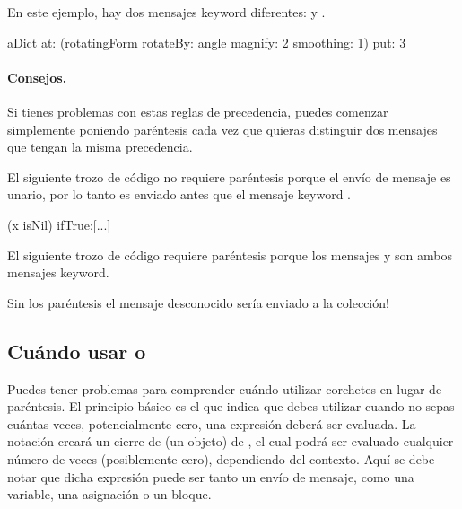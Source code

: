 \documentclass[a4paper,10pt,twoside]{book}
\begin{document}
En este ejemplo, hay dos mensajes keyword diferentes:  y .

\begin{code}{}
aDict
   at: (rotatingForm 
          rotateBy: angle	
          magnify: 2 
          smoothing: 1)
   put: 3
\end{code}



\paragraph{Consejos.} Si tienes problemas con estas reglas de precedencia, puedes comenzar simplemente poniendo paréntesis cada vez que quieras distinguir dos mensajes que tengan la misma precedencia.

El siguiente trozo de código no requiere paréntesis porque el envío de mensaje  es unario, por lo tanto es enviado antes que el mensaje keyword .
\begin{code}{}
(x isNil)
   ifTrue:[...]
\end{code}

El siguiente trozo de código requiere paréntesis porque los mensajes  y  son ambos mensajes keyword. 
\noindent
Sin los paréntesis el mensaje desconocido  sería enviado a la colección!

\subsection{Cuándo usar \lct{[ ]} o \lct{( )}}
Puedes tener problemas para comprender cuándo utilizar corchetes en lugar de paréntesis.
El principio básico es el que indica que debes utilizar \ct{[ ]} cuando no sepas cuántas veces, potencialmente cero, una expresión deberá ser evaluada.
La notación  creará un cierre de  (\ie un objeto) de , el cual podrá ser evaluado cualquier número de veces (posiblemente cero), dependiendo del contexto. Aquí se debe notar que dicha expresión puede ser tanto un envío de mensaje, como una variable, una asignación o un bloque.
\end{document}
